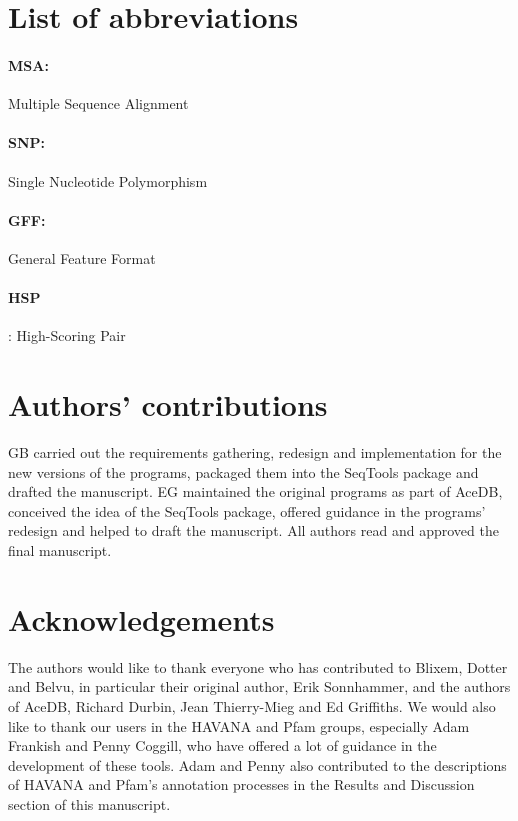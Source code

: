 \documentclass[10pt]{bmc_article}
\newenvironment{bmcformat}{\begin{raggedright}\baselineskip20pt\sloppy\setboolean{publ}{false}}{\end{raggedright}\baselineskip20pt\sloppy}
\begin{document}
\begin{bmcformat}
\section*{List of abbreviations}
\paragraph{MSA:} Multiple Sequence Alignment
\paragraph{SNP:} Single Nucleotide Polymorphism
\paragraph{GFF:} General Feature Format
\paragraph{HSP}: High-Scoring Pair


\section*{Authors' contributions}
GB carried out the requirements gathering, redesign and implementation for the new versions of the programs, packaged them into the SeqTools package and drafted the manuscript. EG maintained the original programs as part of AceDB, conceived the idea of the SeqTools package, offered guidance in the programs' redesign and helped to draft the manuscript. All authors read and approved the final manuscript.



\section*{Acknowledgements}
The authors would like to thank everyone who has contributed to Blixem, Dotter and Belvu, in particular their original author, Erik Sonnhammer, and the authors of AceDB, Richard Durbin, Jean Thierry-Mieg and Ed Griffiths.  We would also like to thank our users in the HAVANA and Pfam groups, especially Adam Frankish and Penny Coggill, who have offered a lot of guidance in the development of these tools. Adam and Penny also contributed to the descriptions of HAVANA and Pfam's annotation processes in the Results and Discussion section of this manuscript.


\end{bmcformat}
\end{document}
